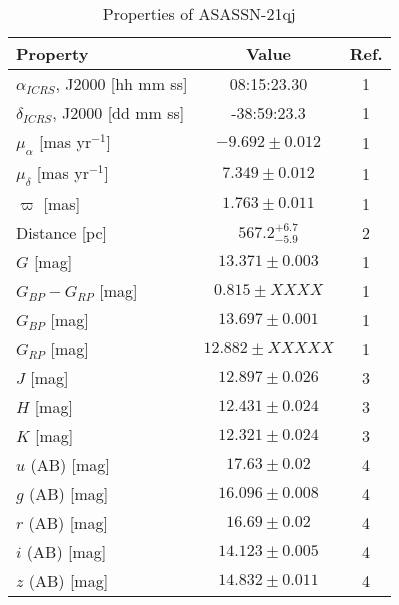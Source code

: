 \documentclass{aa}
\newcommand{\asas}{ASASSN-21qj}
\begin{document}
\begin{table}
    \centering
    \caption{Properties of \asas}
    \begin{tabular}{@{}lcc@{}}
    \hline\hline
Property                               & Value                     & Ref.  \\
        \hline
         $\alpha_{ICRS}$, J2000 {[}hh mm ss{]}  & 08:15:23.30              & 1     \\
         $\delta_{ICRS}$, J2000 {[}dd mm ss{]}  & -38:59:23.3              & 1     \\
         $\mu_{\alpha}$ {[}mas yr$^{-1}${]}     & $-9.692\pm0.012$          & 1     \\
         $\mu_{\delta}$ {[}mas yr$^{-1}${]}     & $7.349\pm0.012$          & 1     \\
         $\varpi$ {[}mas{]}                     & $1.763\pm0.011$         & 1     \\
         Distance {[}pc{]}                      & $567.2^{+6.7}_{-5.9}$     & 2     \\ 
        \hline
         $G$ {[}mag{]}                          & $13.371\pm 0.003$        & 1     \\
         $G_{BP}-G_{RP}$ {[}mag{]}              & $0.815\pm XXXX$        & 1     \\
         $G_{BP}$ {[}mag{]}                     & $13.697\pm 0.001$        & 1     \\
         $G_{RP}$ {[}mag{]}                     & $12.882\pm XXXXX$        & 1     \\
         $J$ {[}mag{]}                          & $12.897\pm0.026$          & 3     \\
         $H$ {[}mag{]}                          & $12.431\pm0.024$          & 3     \\
         $K$ {[}mag{]}                          & $12.321\pm0.024$          & 3     \\
         $u$ (AB) {[}mag{]}                     & $17.63\pm0.02$            & 4     \\
         $g$ (AB) {[}mag{]}                     & $16.096\pm0.008$          & 4     \\
         $r$ (AB) {[}mag{]}                     & $16.69\pm0.02$            & 4     \\
         $i$ (AB) {[}mag{]}                     & $14.123\pm0.005$          & 4     \\
         $z$ (AB) {[}mag{]}                     & $14.832\pm0.011$          & 4     \\

\end{tabular}
\end{table}
\end{document}
